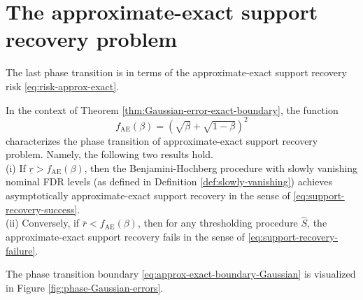 \section{The approximate-exact support recovery problem}
\label{subsec:aprox-exact-support-recovery-Gaussian}

The last phase transition is in terms of the approximate-exact support recovery risk
\eqref{eq:risk-approx-exact}.

\begin{theorem} \label{thm:Gaussian-error-approx-exact-boundary}
In the context of Theorem \ref{thm:Gaussian-error-exact-boundary}, the function 
\begin{equation} \label{eq:approx-exact-boundary-Gaussian}
    f_{\mathrm{AE}}(\beta) = \left(\sqrt{\beta} + \sqrt{1-\beta}\right)^2
\end{equation}
characterizes the phase transition of approximate-exact support recovery problem.  Namely, the following two results 
hold.\\

{\rm (i)} If $\underline{r} > f_{\mathrm{AE}}(\beta)$, then the Benjamini-Hochberg procedure with slowly vanishing nominal FDR levels (as defined in Definition \ref{def:slowly-vanishing}) achieves asymptotically approximate-exact support recovery in the sense of \eqref{eq:support-recovery-success}. \\

{\rm (ii)} Conversely, if $\overline{r} < f_{\mathrm{AE}}(\beta)$, then for any thresholding procedure $\widehat{S}$, the approximate-exact support recovery fails in the sense of \eqref{eq:support-recovery-failure}.
\end{theorem}

The phase transition boundary \eqref{eq:approx-exact-boundary-Gaussian} is visualized in Figure \ref{fig:phase-Gaussian-errors}.

